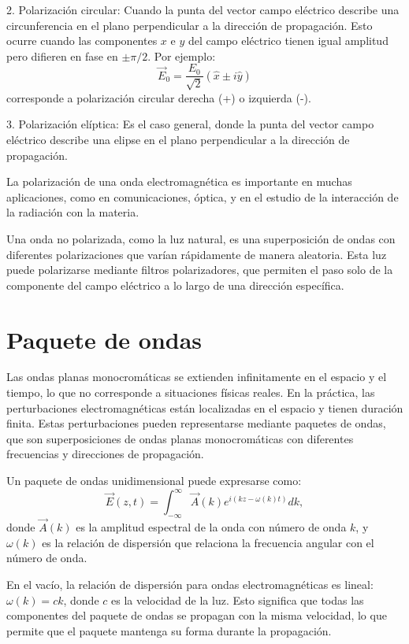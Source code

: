 \documentclass[12pt,a4paper]{book}
\begin{document}
2. Polarización circular: Cuando la punta del vector campo eléctrico describe una circunferencia en el plano perpendicular a la dirección de propagación. Esto ocurre cuando las componentes $x$ e $y$ del campo eléctrico tienen igual amplitud pero difieren en fase en $\pm \pi/2$. Por ejemplo:
   \begin{equation}
   \vec{E}_0 = \frac{E_0}{\sqrt{2}}(\hat{x} \pm i\hat{y})
   \end{equation}
   corresponde a polarización circular derecha (+) o izquierda (-).

3. Polarización elíptica: Es el caso general, donde la punta del vector campo eléctrico describe una elipse en el plano perpendicular a la dirección de propagación.

La polarización de una onda electromagnética es importante en muchas aplicaciones, como en comunicaciones, óptica, y en el estudio de la interacción de la radiación con la materia.

Una onda no polarizada, como la luz natural, es una superposición de ondas con diferentes polarizaciones que varían rápidamente de manera aleatoria. Esta luz puede polarizarse mediante filtros polarizadores, que permiten el paso solo de la componente del campo eléctrico a lo largo de una dirección específica.

\section{Paquete de ondas}

Las ondas planas monocromáticas se extienden infinitamente en el espacio y el tiempo, lo que no corresponde a situaciones físicas reales. En la práctica, las perturbaciones electromagnéticas están localizadas en el espacio y tienen duración finita. Estas perturbaciones pueden representarse mediante paquetes de ondas, que son superposiciones de ondas planas monocromáticas con diferentes frecuencias y direcciones de propagación.

Un paquete de ondas unidimensional puede expresarse como:
\begin{equation}
\vec{E}(z, t) = \int_{-\infty}^{\infty} \vec{A}(k) e^{i(kz - \omega(k)t)} dk,
\end{equation}
donde $\vec{A}(k)$ es la amplitud espectral de la onda con número de onda $k$, y $\omega(k)$ es la relación de dispersión que relaciona la frecuencia angular con el número de onda.

En el vacío, la relación de dispersión para ondas electromagnéticas es lineal: $\omega(k) = ck$, donde $c$ es la velocidad de la luz. Esto significa que todas las componentes del paquete de ondas se propagan con la misma velocidad, lo que permite que el paquete mantenga su forma durante la propagación.
\end{document}

